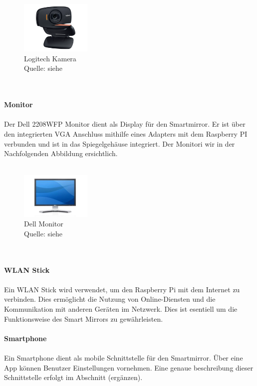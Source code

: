 \noindent
\begin{figure}[h]
    \centering
    \includegraphics[width=0.3\textwidth]{pictures/logitech_kamera.png}
  \captionsetup{justification=centering, labelformat=simple, singlelinecheck=false}
    \caption[Logitech Kamera]{Logitech Kamera\\ Quelle: siehe \cite{logitech_camera}}
\end{figure} \\ \\
\noindent
\textbf{Monitor} \\ \\
Der Dell 2208WFP Monitor dient als Display für den Smartmirror. Er ist über den integrierten VGA Anschluss mithilfe eines Adapters mit dem Raspberry PI verbunden und ist in das Spiegelgehäuse integriert. Der Monitori wir in der Nachfolgenden Abbildung ersichtlich. \\ \\
\noindent
\begin{figure}[h]
    \centering
    \includegraphics[width=0.3\textwidth]{pictures/dell_monitor.jpg}
  \captionsetup{justification=centering, labelformat=simple, singlelinecheck=false}
    \caption[Dell Monitor]{Dell Monitor\\ Quelle:  siehe \cite{dell_monitor}}
\end{figure} \\ \\
\noindent
\textbf{WLAN Stick} \\ \\
Ein WLAN Stick wird verwendet, um den Raspberry Pi mit dem Internet zu verbinden. Dies ermöglicht die Nutzung von Online-Diensten und die Kommunikation mit anderen Geräten im Netzwerk. Dies ist esentiell um die Funktionsweise des Smart Mirrors zu gewährleisten. \\ \\
\noindent
\textbf{Smartphone} \\ \\
Ein Smartphone dient als mobile Schnittstelle für den Smartmirror. Über eine App können Benutzer Einstellungen vornehmen. Eine genaue beschreibung dieser Schnittstelle erfolgt im Abschnitt (ergänzen). \\ \\
\noindent
